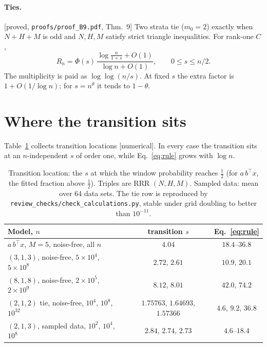 \documentclass[11pt]{article}
\newcommand{\file}[1]{\nolinkurl{#1}}
\newcommand{\status}[1]{\textsf{[#1]}}
\begin{document}
\paragraph{Ties.} \status{proved, \file{proofs/proof_B9.pdf}, Thm.~9}
Two strata tie ($m_0=2$) exactly when $N+H+M$ is odd and $N,H,M$ satisfy strict triangle inequalities.
For rank-one $C$,
\begin{equation}
  R_n=\Phi(s)\,\frac{\log\frac n{1+s}+O(1)}{\log n+O(1)},\qquad 0\le s\le n/2 .
  \label{eq:tie}
\end{equation}
The multiplicity is paid as $\log\log(n/s)$.
At fixed $s$ the extra factor is $1+O(1/\log n)$; for $s=n^\theta$ it tends to $1-\theta$.

\section{Where the transition sits}

Table~\ref{tab:locations} collects transition locations \status{numerical}.
In every case the transition sits at an $n$-independent $s$ of order one, while Eq.~\eqref{eq:rule} grows with $\log n$.

\begin{table}[h]
\centering
\begin{tabular}{lcc}
\toprule
Model, $n$ & transition $s$ & Eq.~\eqref{eq:rule} \\
\midrule
$a\,b^\top x$, $M=5$, noise-free, all $n$ & $4.04$ & $18.4$--$36.8$ \\
$(3,1,3)$, noise-free, $5{\times}10^{4}$, $5{\times}10^{8}$ & $2.72$, $2.61$ & $10.9$, $20.1$ \\
$(8,1,8)$, noise-free, $2{\times}10^{5}$, $2{\times}10^{9}$ & $8.12$, $8.01$ & $42.0$, $74.2$ \\
$(2,1,2)$ tie, noise-free, $10^{4}$, $10^{8}$, $10^{32}$ & $1.75763$, $1.64693$, $1.57366$ & $4.6$, $9.2$, $36.8$ \\
$(2,1,3)$, sampled data, $10^{2}$, $10^{4}$, $10^{8}$ & $2.84$, $2.74$, $2.73$ & $4.6$--$18.4$ \\
\bottomrule
\end{tabular}
\caption{Transition location: the $s$ at which the window probability reaches $\tfrac12$ (for $a\,b^\top x$, the fitted fraction above $\tfrac12$). Triples are RRR $(N,H,M)$. Sampled data: mean over 64 data sets. The tie row is reproduced by \file{review_checks/check_calculations.py}, stable under grid doubling to better than $10^{-11}$.}
\label{tab:locations}
\end{table}
\end{document}
